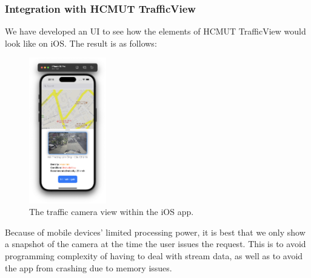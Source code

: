 \subsubsection{Integration with HCMUT TrafficView}
We have developed an UI to see how the elements of HCMUT TrafficView would look like on iOS. The result is as follows:

\begin{figure}[H]
    \centering
    \includegraphics[width=0.3\textwidth]{assets/images/Implementation/hcmut_trafficview.png}
    \caption{The traffic camera view within the iOS app.}
    \label{fig:trafficview_ios}
\end{figure}

Because of mobile devices' limited processing power, it is best that we only show a snapshot of the camera at the time the user issues the request. This is to avoid programming complexity of having to deal with stream data, as well as to avoid the app from crashing due to memory issues.